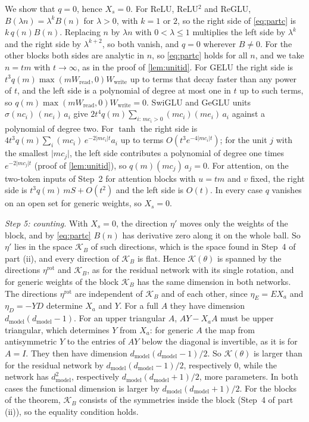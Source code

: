 \documentclass[10pt]{article}
\theoremstyle{definition}
\theoremstyle{remark}
\newcommand{\Wread}{W_{\mathrm{read}}}
\newcommand{\Wwrite}{W_{\mathrm{write}}}
\newcommand{\dm}{d_{\mathrm{model}}}
\begin{document}
We show that $q = 0$, hence $X_s = 0$. For ReLU, ReLU$^2$ and ReGLU, $B(\lambda n) = \lambda^kB(n)$ for $\lambda > 0$, with $k = 1$ or $2$, so the right side of \cref{eq:partc} is $k\,q(n)B(n)$. Replacing $n$ by $\lambda n$ with $0 < \lambda \le 1$ multiplies the left side by $\lambda^k$ and the right side by $\lambda^{k+2}$, so both vanish, and $q = 0$ wherever $B \neq 0$. For the other blocks both sides are analytic in $n$, so \cref{eq:partc} holds for all $n$, and we take $n = tm$ with $t \to \infty$, as in the proof of \cref{lem:unitid}. For GELU the right side is $t^3q(m)\max(m\Wread, 0)\Wwrite$ up to terms that decay faster than any power of $t$, and the left side is a polynomial of degree at most one in $t$ up to such terms, so $q(m)\max(m\Wread, 0)\Wwrite = 0$. SwiGLU and GeGLU units $\sigma(nc_i)\,(ne_i)\,a_i$ give $2t^4q(m)\sum_{i:\,mc_i > 0}(mc_i)(me_i)\,a_i$ against a polynomial of degree two. For $\tanh$ the right side is $4t^3q(m)\sum_i (mc_i)\,e^{-2\lvert mc_i\rvert t}a_i$ up to terms $O(t^3e^{-4\lvert mc_i\rvert t})$; for the unit $j$ with the smallest $\lvert mc_j\rvert$, the left side contributes a polynomial of degree one times $e^{-2\lvert mc_j\rvert t}$ (proof of \cref{lem:unitid}), so $q(m)(mc_j)\,a_j = 0$. For attention, on the two-token inputs of Step~2 for attention blocks with $u = tm$ and $v$ fixed, the right side is $t^3q(m)\,mS + O(t^2)$ and the left side is $O(t)$. In every case $q$ vanishes on an open set for generic weights, so $X_s = 0$.

\emph{Step 5: counting.} With $X_s = 0$, the direction $\eta'$ moves only the weights of the block, and by \cref{eq:partc} $B(n)$ has derivative zero along it on the whole ball. So $\eta'$ lies in the space $\mathcal K_B$ of such directions, which is the space found in Step~4 of part (ii), and every direction of $\mathcal K_B$ is flat. Hence $\mathcal K(\theta)$ is spanned by the directions $\eta^{\mathrm{rot}}$ and $\mathcal K_B$, as for the residual network with its single rotation, and for generic weights of the block $\mathcal K_B$ has the same dimension in both networks. The directions $\eta^{\mathrm{rot}}$ are independent of $\mathcal K_B$ and of each other, since $\eta_E = EX_a$ and $\eta_D = -YD$ determine $X_a$ and $Y$. For a full $A$ they have dimension $\dm(\dm-1)$. For an upper triangular $A$, $AY - X_aA$ must be upper triangular, which determines $Y$ from $X_a$: for generic $A$ the map from antisymmetric $Y$ to the entries of $AY$ below the diagonal is invertible, as it is for $A = I$. They then have dimension $\dm(\dm-1)/2$. So $\mathcal K(\theta)$ is larger than for the residual network by $\dm(\dm-1)/2$, respectively $0$, while the network has $\dm^2$, respectively $\dm(\dm+1)/2$, more parameters. In both cases the functional dimension is larger by $\dm(\dm+1)/2$. For the blocks of the theorem, $\mathcal K_B$ consists of the symmetries inside the block (Step~4 of part (ii)), so the equality condition holds.
\end{document}
